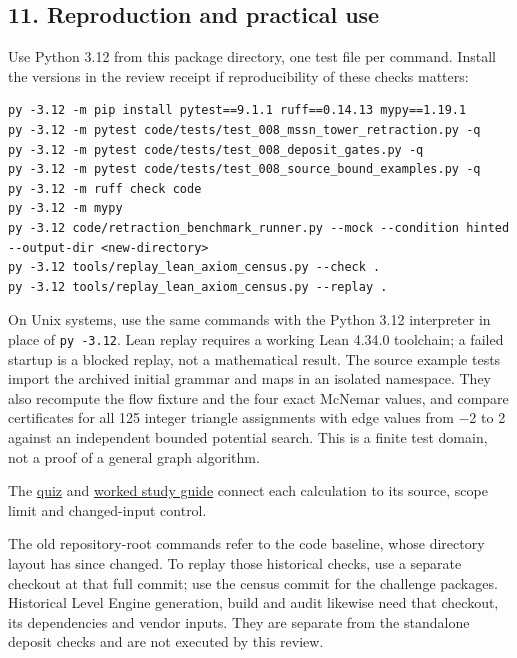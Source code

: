 \documentclass[
  11pt,
]{article}
\newcommand{\passthrough}[1]{#1}
\begin{document}
\hypertarget{reproduction-and-practical-use}{%
\subsection{11. Reproduction and practical
use}\label{reproduction-and-practical-use}}

Use Python 3.12 from this package directory, one test file per command.
Install the versions in the review receipt if reproducibility of these
checks matters:

\begin{lstlisting}
py -3.12 -m pip install pytest==9.1.1 ruff==0.14.13 mypy==1.19.1
py -3.12 -m pytest code/tests/test_008_mssn_tower_retraction.py -q
py -3.12 -m pytest code/tests/test_008_deposit_gates.py -q
py -3.12 -m pytest code/tests/test_008_source_bound_examples.py -q
py -3.12 -m ruff check code
py -3.12 -m mypy
py -3.12 code/retraction_benchmark_runner.py --mock --condition hinted --output-dir <new-directory>
py -3.12 tools/replay_lean_axiom_census.py --check .
py -3.12 tools/replay_lean_axiom_census.py --replay .
\end{lstlisting}

On Unix systems, use the same commands with the Python 3.12 interpreter
in place of \passthrough{\lstinline!py -3.12!}. Lean replay requires a
working Lean 4.34.0 toolchain; a failed startup is a blocked replay, not
a mathematical result. The source example tests import the archived
initial grammar and maps in an isolated namespace. They also recompute
the flow fixture and the four exact McNemar values, and compare
certificates for all 125 integer triangle assignments with edge values
from −2 to 2 against an independent bounded potential search. This is a
finite test domain, not a proof of a general graph algorithm.

The
\href{https://github.com/dbccpage/the_symbol_game/blob/main/education/documentation/030_pfp_proposal_fidelity_protocol_pfp/papers/symbol_game/008_pfp_mssn_tower_challenges_and_retraction_benchmarks/_lev_examiner_theoretical_minimum_quiz/quiz.md}{quiz}
and
\href{https://github.com/dbccpage/the_symbol_game/blob/main/education/documentation/030_pfp_proposal_fidelity_protocol_pfp/papers/symbol_game/008_pfp_mssn_tower_challenges_and_retraction_benchmarks/_lev_examiner_theoretical_minimum_quiz/study_guide.md}{worked
study guide} connect each calculation to its source, scope limit and
changed-input control.

The old repository-root commands refer to the code baseline, whose
directory layout has since changed. To replay those historical checks,
use a separate checkout at that full commit; use the census commit for
the challenge packages. Historical Level Engine generation, build and
audit likewise need that checkout, its dependencies and vendor inputs.
They are separate from the standalone deposit checks and are not
executed by this review.
\end{document}
